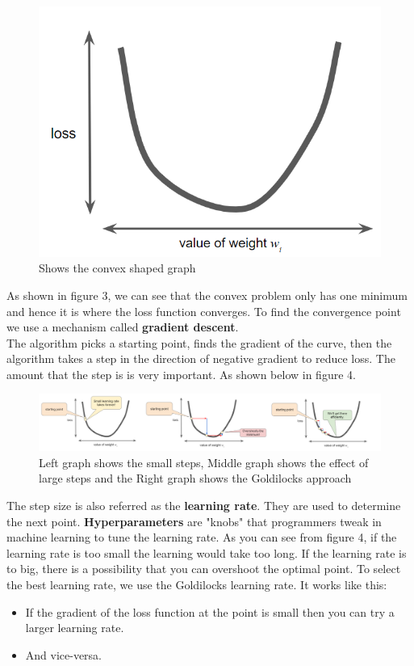 \documentclass[12pt]{article}
\begin{document}
\begin{figure}[ht]
\includegraphics[scale = 0.7]{imgs/lossVSweight}
\caption{Shows the convex shaped graph}
\end{figure}

As shown in figure 3, we can see that the convex problem only has one minimum and hence it is where the loss function converges. To find the convergence point we use a mechanism called \textbf{gradient descent}.
\\The algorithm picks a starting point, finds the gradient of the curve, then the algorithm takes a step in the direction of negative gradient to reduce loss. The amount that the step is is very important. As shown below in figure 4.

\begin{figure}[ht]
\includegraphics[scale = 0.8]{imgs/stepSize}
\caption{Left graph shows the small steps, Middle graph shows the effect of large steps and the Right graph shows the Goldilocks approach}
\centering
\end{figure}
The step size is also referred as the \textbf{learning rate}. They are used to determine the next point.
\textbf{Hyperparameters} are "knobs" that programmers tweak in machine learning to tune the learning rate.
As you can see from figure 4, if the learning rate is too small the learning would take too long. If the learning rate is to big, there is a possibility that you can overshoot the optimal point.
To select the best learning rate, we use the Goldilocks learning rate. It works like this:
\begin{itemize}
	\item If the gradient of the loss function at the point is small then you can try a larger learning rate.
	\item And vice-versa.
\end{itemize}
\end{document}
